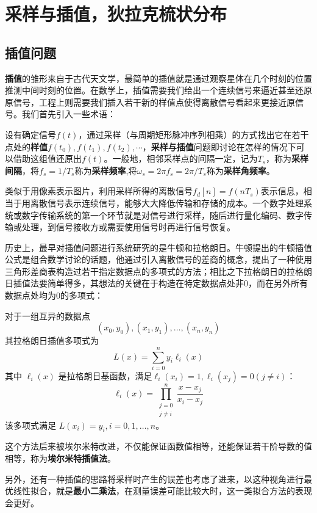 \section{采样与插值，狄拉克梳状分布}\label{sec:Sampling_Interpolation}

\subsection{插值问题}\label{sub:interpolation}
\textbf{插值}的雏形来自于古代天文学，最简单的插值就是通过观察星体在几个时刻的位置推测中间时刻的位置。在数学上，插值需要我们给出一个连续信号来逼近甚至还原原信号，工程上则需要我们插入若干新的样值点使得离散信号看起来更接近原信号。我们首先引入一些术语：
\begin{definition}
设有确定信号$f(t)$，通过采样（与周期矩形脉冲序列相乘）的方式找出它在若干点处的\textbf{样值}$f(t_0),f(t_1),f(t_2),\cdots$，\textbf{采样与插值}问题即讨论在怎样的情况下可以借助这组值还原出$f(t)$。一般地，相邻采样点的间隔一定，记为$T_s$，称为\textbf{采样间隔}，将$f_s=1/T_s$称为\textbf{采样频率},将$\omega_s=2\pi f_s=2\pi/T_s$称为\textbf{采样角频率}。
\end{definition}

类似于用像素表示图片，利用采样所得的离散信号$f_d[n]=f(nT_s)$表示信息，相当于用离散信号表示连续信号，能够大大降低传输和存储的成本。一个数字处理系统或数字传输系统的第一个环节就是对信号进行采样，随后进行量化编码、数字传输或处理，到信号接收方或需要使用信号时再进行信号恢复。

历史上，最早对插值问题进行系统研究的是牛顿和拉格朗日。牛顿提出的牛顿插值公式是组合数学讨论的话题，他通过引入离散信号的差商的概念，提出了一种使用三角形差商表构造过若干指定数据点的多项式的方法；相比之下拉格朗日的拉格朗日插值法要简单得多，其想法的关键在于构造在特定数据点处非0，而在另外所有数据点处均为0的多项式：
\begin{definition}[拉格朗日插值法]
    对于一组互异的数据点
 \[(x_0,y_0),(x_1,y_1),\dots,(x_n,y_n)\]
 其拉格朗日插值多项式为
\[L(x) = \sum_{i=0}^{n} y_i \ell_i(x)\]
其中 $\ell_i(x)$ 是拉格朗日基函数，满足$\ell_i(x_i)=1,\ell_i(x_j)=0(j\neq i)$：
\[\ell_i(x) = \prod_{\substack{j=0 \\ j \neq i}}^{n} \frac{x - x_j}{x_i - x_j}\]
该多项式满足 $L(x_i) = y_i,i=0,1,\dots,n$。
\end{definition}
这个方法后来被埃尔米特改进，不仅能保证函数值相等，还能保证若干阶导数的值相等，称为\textbf{埃尔米特插值法}。

另外，还有一种插值的思路将采样时产生的误差也考虑了进来，以这种视角进行最优线性拟合，就是\textbf{最小二乘法}，在测量误差可能比较大时，这一类拟合方法的表现会更好。

